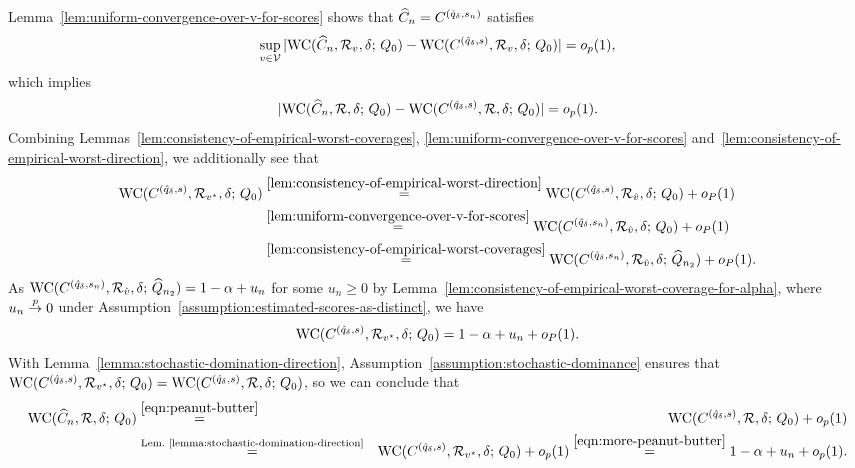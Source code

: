 Lemma~\ref{lem:uniform-convergence-over-v-for-scores} shows that $\widehat{C}_n
= C^{(\hat q_{\delta}, s_n)}$ satisfies
\begin{align*}
  \sup_ {v \in \mathcal{V}} |\textup{WC}( \widehat{C}_n, \mathcal{R}_{v}, \delta; \, Q_0)-\textup{WC}( {C}^{(\hat q_{\delta},  s)}, \mathcal{R}_{v}, \delta; \, Q_0)| = o_p(1),
\end{align*}
which implies
\begin{equation}
  \label{eqn:peanut-butter}
  |\textup{WC}( \widehat{C}_n, \mathcal{R}, \delta; \, Q_0) -\textup{WC}( {C}^{( \hat q_{\delta},  s)}, \mathcal{R}, \delta; \, Q_0)| = o_p(1).
\end{equation}
Combining
Lemmas~\ref{lem:consistency-of-empirical-worst-coverages},
\ref{lem:uniform-convergence-over-v-for-scores}
and~\ref{lem:consistency-of-empirical-worst-direction}, we
additionally see that
\begin{align*}
\textup{WC}( {C}^{(\hat q_{\delta},  s)}, \mathcal{R}_{v^\star}, \delta; \, Q_0)
&\overset{\ref{lem:consistency-of-empirical-worst-direction}}{=}
 \textup{WC}( {C}^{(\hat q_{\delta},  s)}, \mathcal{R}_{\hat v}, \delta; \, Q_0) +o_{P}(1) \\
&\overset{\ref{lem:uniform-convergence-over-v-for-scores} }{=}
 \textup{WC}( {C}^{(\hat q_{\delta},  s_n)}, \mathcal{R}_{\hat v}, \delta; \, Q_0) +o_{P}(1) \\
&\overset{\ref{lem:consistency-of-empirical-worst-coverages}}{=} 
\textup{WC}( {C}^{(\hat q_{\delta},  s_n)}, \mathcal{R}_{\hat v}, \delta; \, \widehat{Q}_{n_2}) +o_{P}(1).
\end{align*}
As $\textup{WC}( {C}^{(\hat q_{\delta}, s_n)}, \mathcal{R}_{\hat v}, \delta; \,
\widehat{Q}_{n_2}) = 1- \alpha + u_n$ for some $u_n \ge 0$ by
Lemma~\ref{lem:consistency-of-empirical-worst-coverage-for-alpha}, where
$u_n \stackrel{p}{\rightarrow} 0$ under Assumption~\ref{assumption:estimated-scores-as-distinct},
we have
\begin{align}
  \label{eqn:more-peanut-butter}
  \textup{WC}( {C}^{(\hat q_{\delta}, s)}, \mathcal{R}_{v^\star}, \delta; \, Q_0)
  = 1 - \alpha + u_n + o_P(1).
\end{align}
With Lemma~\ref{lemma:stochastic-domination-direction},
Assumption~\ref{assumption:stochastic-dominance} ensures that
$\textup{WC}( {C}^{(\hat q_{\delta},  s)}, \mathcal{R}_{v^\star}, \delta; \, Q_0)= \textup{WC}( {C}^{(\hat q_{\delta},  s)}, \mathcal{R}, \delta; \, Q_0)$,
so we can conclude that
\begin{eqnarray*}
  \textup{WC}( \widehat{C}_n , \mathcal{R}, \delta; \, Q_0)
  & \stackrel{\eqref{eqn:peanut-butter}}{=} &
  \textup{WC}( {C}^{( \hat q_{\delta},  s)}, \mathcal{R}, \delta; \, Q_0) + o_p(1) \\
  & \stackrel{\textup{Lem.~\ref{lemma:stochastic-domination-direction}}}{=} &
  \textup{WC}( {C}^{( \hat q_{\delta},  s)}, \mathcal{R}_{v^\star}, \delta; \, Q_0) + o_p(1)
  \stackrel{\eqref{eqn:more-peanut-butter}}{=} 1 - \alpha + u_n + o_p(1).
\end{eqnarray*}


